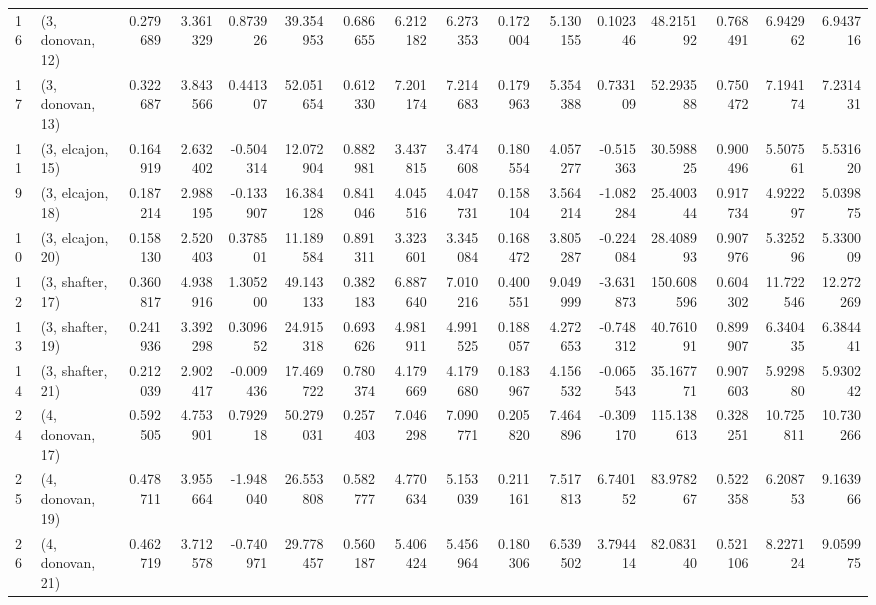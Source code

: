 \begin{tabular}{llrrrrrrrrrrrrrr}
16 &  (3, donovan, 12) &   0.279689 &  3.361329 &  0.873926 &   39.354953 &  0.686655 &   6.212182 &   6.273353 &  0.172004 &   5.130155 &  0.102346 &   48.215192 &  0.768491 &   6.942962 &   6.943716 \\
17 &  (3, donovan, 13) &   0.322687 &  3.843566 &  0.441307 &   52.051654 &  0.612330 &   7.201174 &   7.214683 &  0.179963 &   5.354388 &  0.733109 &   52.293588 &  0.750472 &   7.194174 &   7.231431 \\
11 &  (3, elcajon, 15) &   0.164919 &  2.632402 & -0.504314 &   12.072904 &  0.882981 &   3.437815 &   3.474608 &  0.180554 &   4.057277 & -0.515363 &   30.598825 &  0.900496 &   5.507561 &   5.531620 \\
9  &  (3, elcajon, 18) &   0.187214 &  2.988195 & -0.133907 &   16.384128 &  0.841046 &   4.045516 &   4.047731 &  0.158104 &   3.564214 & -1.082284 &   25.400344 &  0.917734 &   4.922297 &   5.039875 \\
10 &  (3, elcajon, 20) &   0.158130 &  2.520403 &  0.378501 &   11.189584 &  0.891311 &   3.323601 &   3.345084 &  0.168472 &   3.805287 & -0.224084 &   28.408993 &  0.907976 &   5.325296 &   5.330009 \\
12 &  (3, shafter, 17) &   0.360817 &  4.938916 &  1.305200 &   49.143133 &  0.382183 &   6.887640 &   7.010216 &  0.400551 &   9.049999 & -3.631873 &  150.608596 &  0.604302 &  11.722546 &  12.272269 \\
13 &  (3, shafter, 19) &   0.241936 &  3.392298 &  0.309652 &   24.915318 &  0.693626 &   4.981911 &   4.991525 &  0.188057 &   4.272653 & -0.748312 &   40.761091 &  0.899907 &   6.340435 &   6.384441 \\
14 &  (3, shafter, 21) &   0.212039 &  2.902417 & -0.009436 &   17.469722 &  0.780374 &   4.179669 &   4.179680 &  0.183967 &   4.156532 & -0.065543 &   35.167771 &  0.907603 &   5.929880 &   5.930242 \\
24 &  (4, donovan, 17) &   0.592505 &  4.753901 &  0.792918 &   50.279031 &  0.257403 &   7.046298 &   7.090771 &  0.205820 &   7.464896 & -0.309170 &  115.138613 &  0.328251 &  10.725811 &  10.730266 \\
25 &  (4, donovan, 19) &   0.478711 &  3.955664 & -1.948040 &   26.553808 &  0.582777 &   4.770634 &   5.153039 &  0.211161 &   7.517813 &  6.740152 &   83.978267 &  0.522358 &   6.208753 &   9.163966 \\
26 &  (4, donovan, 21) &   0.462719 &  3.712578 & -0.740971 &   29.778457 &  0.560187 &   5.406424 &   5.456964 &  0.180306 &   6.539502 &  3.794414 &   82.083140 &  0.521106 &   8.227124 &   9.059975 \\

\end{tabular}
